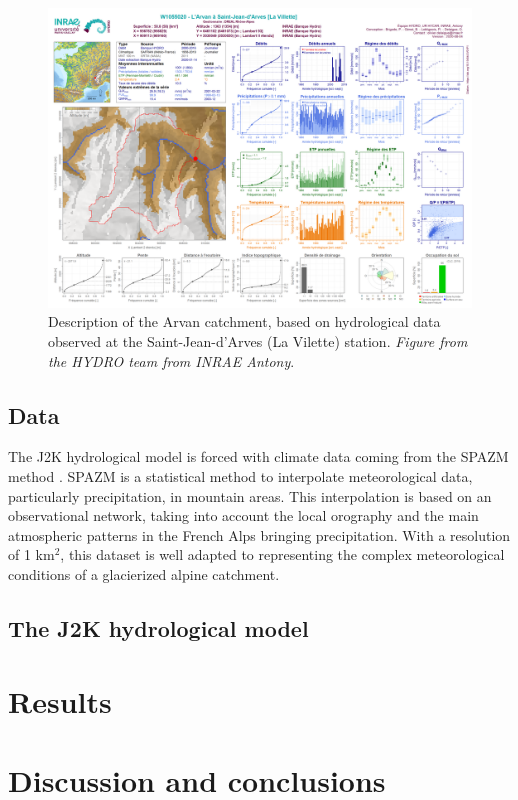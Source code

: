 \begin{figure}
\centering
\includegraphics[width=23cm]{Figures/hydro/Figure_1.png}
\captionsetup{justification=centering}
\caption{Description of the Arvan catchment, based on hydrological data observed at the Saint-Jean-d'Arves (La Vilette) station. 
\textit{Figure from the HYDRO team from INRAE Antony}.}
\label{hydro:fig1}
\end{figure}

\subsection{Data}

The J2K hydrological model is forced with climate data coming from the SPAZM method \citep{gottardi_statistical_2012}. SPAZM is a statistical method to interpolate meteorological data, particularly precipitation, in mountain areas. This interpolation is based on an observational network, taking into account the local orography and the main atmospheric patterns in the French Alps bringing precipitation. With a resolution of 1 km$^{2}$, this dataset is well adapted to representing the complex meteorological conditions of a glacierized alpine catchment. 

\subsection{The J2K hydrological model}

\section{Results}

\section{Discussion and conclusions}


